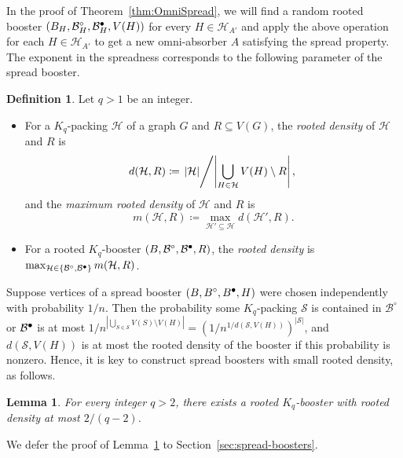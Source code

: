 \documentclass[11pt]{article}
\numberwithin{equation}{section}
\newcounter{i}
\theoremstyle{plain}
\newtheorem{lem}[thm]{Lemma}
\theoremstyle{plain} %
\theoremstyle{definition}
\newtheorem{definition}[thm]{Definition}
\newcommand{\cB}{\mathcal{B}}
\newcommand{\cS}{\mathcal{S}}
\newcommand{\cH}{\mathcal{H}}
\newcommand\filledcirc{\ensuremath{{\bullet}\mathllap{\circ}}}
\begin{document}
In the proof of Theorem~\ref{thm:OmniSpread}, we will find a random rooted booster $(B_H, \cB^{\circ}_H, \cB^{\filledcirc}_H, V(H))$ for every $H \in \cH_{A'}$
and apply the above operation for each $H \in \cH_{A'}$ to get a new omni-absorber $A$ satisfying the spread property.
The exponent in the spreadness corresponds to the following parameter of the spread booster.


\begin{definition}\label{def:RootedDensity} Let $q > 1$ be an integer.
\begin{itemize}
    \item For a $K_q$-packing $\cH$ of a graph $G$ and $R \subseteq V(G)$, the \textit{rooted density} of $\cH$ and $R$ is
    \begin{equation*}
        d(\cH, R) \coloneqq \left. |\cH| \middle/ \left|\bigcup_{H\in \cH}V(H)\setminus R\right|,\right.
    \end{equation*}
    and the \textit{maximum rooted density} of $\cH$ and $R$ is
    \begin{equation*}
        m(\cH, R) \coloneqq \max_{\cH' \subseteq \cH}d(\cH', R).
    \end{equation*}
    \item For a rooted $K_q$-booster $(B, \cB^{\circ}, \cB^{\filledcirc}, R)$, the \textit{rooted density} is $
        \max_{\cH \in \{\cB^{\circ}, \cB^{\filledcirc}\}}m(\cH, R)$.
\end{itemize}
\end{definition}

Suppose vertices of a spread booster $(B, B^\circ, B^{\filledcirc}, H)$ were chosen independently with probability $1 / n$.  Then the probability some $K_q$-packing $\cS$ is contained in $\cB^\circ$ or $\cB^{\filledcirc}$ is at most $1 / n^{|\bigcup_{S\in \cS}V(S)\setminus V(H)|} = \left(1 / n^{1/d(\cS, V(H))}\right)^{|\cS|}$, and $d(\cS, V(H))$ is at most the rooted density of the booster if this probability is nonzero.  Hence, it is key to construct spread boosters with small rooted density, as follows.

\begin{lem}\label{lem:sparse-boosters-exist}
  For every integer $q > 2$, there exists a rooted $K_q$-booster with rooted density at most $2/(q-2)$.
\end{lem}

We defer the proof of Lemma~\ref{lem:sparse-boosters-exist} to Section~\ref{sec:spread-boosters}.
\end{document}

